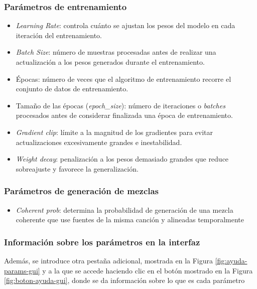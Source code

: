 \subsubsection{Parámetros de entrenamiento}
\begin{itemize}
    \item \textit{Learning Rate}: controla cuánto se ajustan los pesos del modelo en cada iteración del entrenamiento.
    \item \textit{Batch Size}: número de muestras procesadas antes de realizar una actualización a los pesos generados durante el entrenamiento.
    \item Épocas: número de veces que el algoritmo de entrenamiento recorre el conjunto de datos de entrenamiento.
    \item Tamaño de las épocas (\textit{epoch\_size}): número de iteraciones o \textit{batches} procesados antes de considerar finalizada una época de entrenamiento. 
    \item \textit{Gradient clip}: límite a la magnitud de los gradientes para evitar actualizaciones excesivamente grandes e inestabilidad.
    \item \textit{Weight decay}: penalización a los pesos demasiado grandes que reduce sobreajuste y favorece la generalización.
\end{itemize}

\subsubsection{Parámetros de generación de mezclas}
\begin{itemize}
    \item \textit{Coherent prob}: determina la probabilidad de generación de una mezcla coherente que use fuentes de la misma canción y alineadas temporalmente
\end{itemize}

\subsubsection{Información sobre los parámetros en la interfaz}
Además, se introduce otra pestaña adicional, mostrada en la Figura \ref{fig:ayuda-params-gui} y a la que se accede haciendo clic en el botón mostrado en la Figura \ref{fig:boton-ayuda-gui}, donde se da información sobre lo que es cada parámetro

